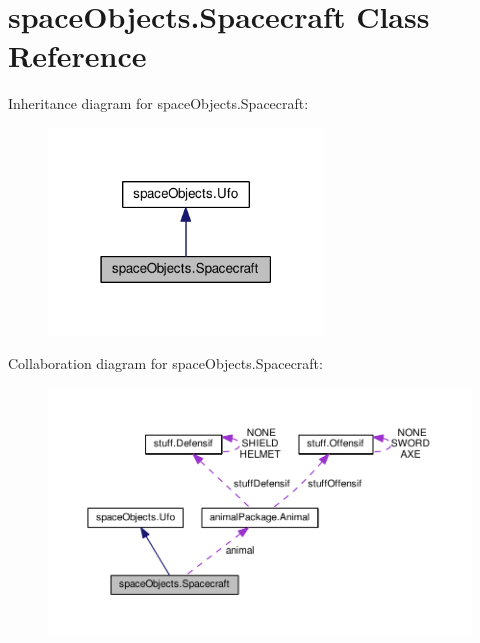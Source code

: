 \hypertarget{classspace_objects_1_1_spacecraft}{}\section{space\+Objects.\+Spacecraft Class Reference}
\label{classspace_objects_1_1_spacecraft}


Inheritance diagram for space\+Objects.\+Spacecraft\+:\nopagebreak
\begin{figure}[H]
\begin{center}
\leavevmode
\includegraphics[width=207pt]{classspace_objects_1_1_spacecraft__inherit__graph}
\end{center}
\end{figure}


Collaboration diagram for space\+Objects.\+Spacecraft\+:\nopagebreak
\begin{figure}[H]
\begin{center}
\leavevmode
\includegraphics[width=350pt]{classspace_objects_1_1_spacecraft__coll__graph}
\end{center}
\end{figure}

